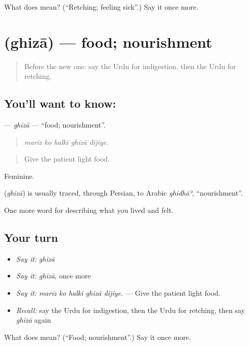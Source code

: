 \begin{tcolorbox}[breakable,colback=teal!4,colframe=teal!35!black,title={Before you move on}]
What does  mean? (\textquotedblleft{}Retching; feeling sick\textquotedblright{}.) Say it once more.
\end{tcolorbox}
\section[\texorpdfstring{\ur{غذا} (ghizā)}{غذا (ghizā)}]{ (ghizā) — food; nourishment}

\label{lesson:UR-C472-ghiza}



\begin{quote}
Before the new one: say the Urdu for indigestion, then the Urdu for retching.
\end{quote}

\subsection*{You'll want to know: }
\textbf{} — \emph{ghizā} — \textquotedblleft{}food; nourishment\textquotedblright{}.

\begin{quote}
    
\end{quote}

\begin{quote}
\emph{marīz ko halkī ghizā dījiye.}
\end{quote}

\begin{quote}
Give the patient light food.
\end{quote}

Feminine.

\begin{cousinweb}
\textbf{} (\emph{ghizā}) is usually traced, through Persian, to Arabic \emph{ghidhāʾ}, \textquotedblleft{}nourishment\textquotedblright{}.
\end{cousinweb}

\begin{grammarlens}[title={What you've built}]
One more word for describing what you lived and felt.
\end{grammarlens}

\subsection*{Your turn}
\begin{itemize}
\raggedright
  \item \emph{Say it:} \emph{ghizā}
  \item \emph{Say it:} \emph{ghizā}, once more
  \item \emph{Say it:} \emph{marīz ko halkī ghizā dījiye.} — Give the patient light food.
  \item \emph{Recall:} say the Urdu for indigestion, then the Urdu for retching, then say \emph{ghizā} again
\end{itemize}

\begin{tcolorbox}[breakable,colback=teal!4,colframe=teal!35!black,title={Before you move on}]
What does  mean? (\textquotedblleft{}Food; nourishment\textquotedblright{}.) Say it once more.
\end{tcolorbox}
